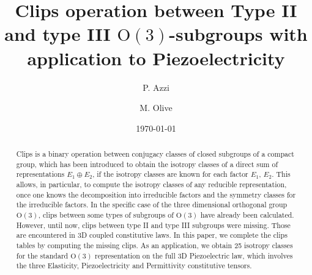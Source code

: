 \documentclass[11pt,a4paper]{amsart}
\theoremstyle{definition}
\newcommand{\OO}{\mathrm{O}}                %
\newcommand{\1}{\mathds{1}}		            %
\begin{document}
\title[Clips operation between $\OO(3)$-subgroups with application to Piezoelectricity]{Clips operation between Type II and type III $\OO(3)$-subgroups with application to Piezoelectricity}%

\author{P. Azzi}
\address[Perla Azzi]{CNRS, Sorbonne université, IMJ - Institut de mathématiques Jussieu, 75005, Paris, France \& Université Paris-Saclay, CentraleSupélec, ENS Paris-Saclay, CNRS, LMPS - Laboratoire de Mécanique Paris-Saclay, 91190, Gif-sur-Yvette, France}

\author{M. Olive}
\address[Marc Olive]{Université Paris-Saclay, CentraleSupélec, ENS Paris-Saclay, CNRS, LMPS - Laboratoire de Mécanique Paris-Saclay, 91190, Gif-sur-Yvette, France}

%
%

\date{\today}%

\begin{abstract}
  Clips is a binary operation between conjugacy classes of closed subgroups of a compact group, which has been introduced to obtain the isotropy classes of a direct sum of representations $E_{1}\oplus E_{2}$, if the isotropy classes are known for each factor $E_{1}$, $E_{2}$. This allows, in particular, to compute the isotropy classes of any reducible representation, once one knows the decomposition into irreducible factors and the symmetry classes for the irreducible factors. In the specific case of the three dimensional orthogonal group $\OO(3)$, clips between some types of subgroups of $\OO(3)$ have already been calculated. However, until now, clips between type II and type III subgroups were missing. Those are encountered in 3D coupled constitutive laws. In this paper, we complete the clips tables by computing the missing clips. As an application, we obtain 25 isotropy classes for the standard $\OO(3)$ representation on the full 3D Piezoelectric law, which involves the three Elasticity, Piezoelectricity and Permittivity constitutive tensors.
\end{abstract}

\maketitle

\end{document}
